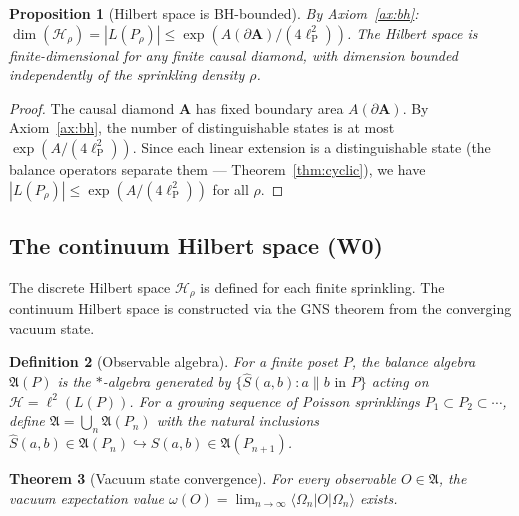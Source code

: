 \documentclass[11pt]{article}
\newtheorem{theorem}{Theorem}[section]
\newtheorem{proposition}[theorem]{Proposition}
\newtheorem{definition}[theorem]{Definition}
\newcommand{\hilb}{\mathscr{H}}
\newcommand{\lP}{\ell_{\mathrm{P}}}
\begin{document}
\begin{proposition}[Hilbert space is BH-bounded]
\label{prop:bh-bound}
By Axiom~\ref{ax:bh}:
$\dim(\hilb_\rho) = |L(P_\rho)| \le
\exp(A(\partial\mathbf{A})/(4\lP^2))$.
The Hilbert space is finite-dimensional for any finite
causal diamond, with dimension bounded independently of
the sprinkling density $\rho$.
\end{proposition}

\begin{proof}
The causal diamond $\mathbf{A}$ has fixed boundary area
$A(\partial\mathbf{A})$.  By Axiom~\ref{ax:bh}, the number
of distinguishable states is at most
$\exp(A/(4\lP^2))$.  Since each linear extension is a
distinguishable state (the balance operators separate
them --- Theorem~\ref{thm:cyclic}), we have
$|L(P_\rho)| \le \exp(A/(4\lP^2))$ for all $\rho$.
\end{proof}

\subsection{The continuum Hilbert space (W0)}
\label{sec:w0}

The discrete Hilbert space $\hilb_\rho$ is defined for each
finite sprinkling.  The continuum Hilbert space is
constructed via the GNS theorem from the converging vacuum
state.

\begin{definition}[Observable algebra]
\label{def:obs-algebra}
For a finite poset $P$, the \emph{balance algebra}
$\mathfrak{A}(P)$ is the $*$-algebra generated by
$\{\hat{S}(a,b) : a \parallel b \text{ in } P\}$ acting on
$\hilb = \ell^2(L(P))$.  For a growing sequence of Poisson
sprinklings $P_1 \subset P_2 \subset \cdots$, define
$\mathfrak{A} = \bigcup_n \mathfrak{A}(P_n)$ with the
natural inclusions $\hat{S}(a,b) \in \mathfrak{A}(P_n)
\hookrightarrow \hat{S}(a,b) \in \mathfrak{A}(P_{n+1})$.
\end{definition}

\begin{theorem}[Vacuum state convergence]
\label{thm:state-conv}
For every observable $O \in \mathfrak{A}$, the vacuum
expectation value
$\omega(O) = \lim_{n \to \infty}
\langle\Omega_n | O | \Omega_n \rangle$
exists.
\end{theorem}
\end{document}
